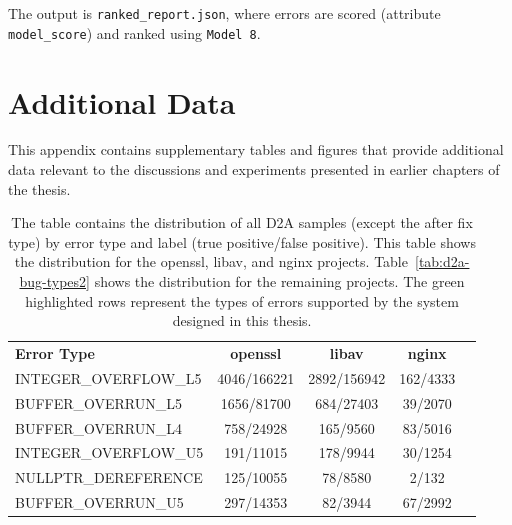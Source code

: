 The output is \texttt{ranked\_report.json}, where errors are scored (attribute \texttt{model\_score}) and ranked using \texttt{Model 8}.


\chapter{Additional Data}
\label{appendix-additional-data}
This appendix contains supplementary tables and figures that provide additional data relevant to the discussions and experiments presented in earlier chapters of the thesis.

\begin{table}[ht]
    \centering
    \caption{The table contains the distribution of all D2A samples (except the after fix type) by error type and label (true positive/false positive). This table shows the distribution for the openssl, libav, and nginx projects. Table~\ref{tab:d2a-bug-types2} shows the distribution for the remaining projects. The green highlighted rows represent the types of errors supported by the system designed in this thesis.}
    \vskip6pt
    \begin{tabular}{!{\vrule width 1pt}l!{\vrule width 1pt}c|c|c!{\vrule width 1pt}c!{\vrule width 1pt}}
         {\footnotesize\textbf{Error Type}} & {\footnotesize\textbf{openssl}} & {\footnotesize\textbf{libav}} & {\footnotesize\textbf{nginx}}\\
         {\scriptsize INTEGER\_OVERFLOW\_L5}&  {\footnotesize 4046/166221}&  {\footnotesize 2892/156942}&  {\footnotesize 162/4333}\\ \hline
         {\scriptsize BUFFER\_OVERRUN\_L5}&    {\footnotesize 1656/81700}&  {\footnotesize 684/27403}&  {\footnotesize 39/2070}\\ \hline
         {\scriptsize BUFFER\_OVERRUN\_L4}&    {\footnotesize 758/24928}&  {\footnotesize 165/9560}&  {\footnotesize 83/5016}\\ \hline
         {\scriptsize INTEGER\_OVERFLOW\_U5}&  {\footnotesize 191/11015}&  {\footnotesize 178/9944}&  {\footnotesize 30/1254}\\ \hline
         {\scriptsize NULLPTR\_DEREFERENCE}&   {\footnotesize 125/10055}&  {\footnotesize 78/8580}&  {\footnotesize 2/132}\\ \hline
         {\scriptsize BUFFER\_OVERRUN\_U5}&    {\footnotesize 297/14353}&  {\footnotesize 82/3944}&  {\footnotesize 67/2992}\\ \hline

\end{tabular}
\end{table}

